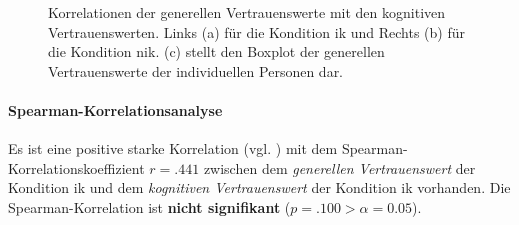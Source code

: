 \documentclass[a4paper,11pt]{article}%
\renewcommand{\\}{\vspace*{0.5\baselineskip} \newline}
\begin{document}
\begin{figure}[h]
  \centering
  \qquad
    \qquad
  \caption[Korrelationen der generellen Vertrauenswerte mit den kognitiven Vertrauenswerten]{Korrelationen der generellen Vertrauenswerte mit den kognitiven Vertrauenswerten. Links (a) für die Kondition \ac{ik} und Rechts (b) für die Kondition \ac{nik}. (c) stellt den Boxplot der generellen Vertrauenswerte der individuellen Personen dar.}
  \label{H2_Korrelation_Auswertung}
\end{figure}

\paragraph{Spearman-Korrelationsanalyse}
Es ist eine positive starke Korrelation (vgl. \citep{cohen2013statistical}) mit dem Spearman-Korrelationskoeffizient $r = .441$ zwischen dem \textit{generellen Vertrauenswert} der Kondition \ac{ik} und dem \textit{kognitiven Vertrauenswert} der Kondition \ac{ik} vorhanden. Die Spearman-Korrelation ist \textbf{nicht signifikant} ($p = .100 > \alpha = 0.05$).
\end{document}
